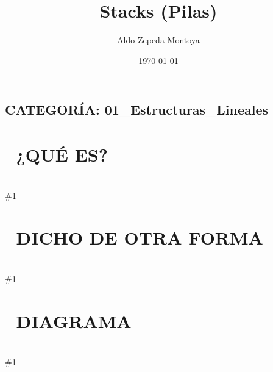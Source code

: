 \documentclass{article}
\newcommand{\quees}[1]{
    \section*{🤔 ¿QUÉ ES?}
    \hrulefill \\
    \#1
}
\newcommand{\dichodeotraforma}[1]{
    \section*{💬 DICHO DE OTRA FORMA}
    \hrulefill \\
    \#1
}
\newcommand{\diagrama}[1]{
    \section*{🎨 DIAGRAMA}
    \hrulefill \\
    \#1
}
\begin{document}
\title{Stacks (Pilas)}
\author{Aldo Zepeda Montoya}
\date{\today}
\maketitle

\subsection*{CATEGORÍA: 01\_Estructuras\_Lineales}

\quees{
Una pila de platos 🍽️ en el fregadero. Solo puedes poner platos
encima (push) y solo puedes agarrar el de hasta arriba (pop). 

Si quieres el plato de abajo, debes quitar todos los de encima primero. 
Es una estructura "LIFO" (Last In, First Out): el último en entrar
es el primero en salir.

Imagina un tubo de papas Pringles 🥔: la última papa que metieron
en la fábrica es la primera que te comes al abrir el tubo.
}

\dichodeotraforma{
Un Stack es una estructura de datos lineal de tipo ADT (Abstract Data
Type) que restringe el acceso a un solo extremo: el "Top". 

Es fundamental para el funcionamiento de las computadoras, ya que
el "Call Stack" de los lenguajes de programación usa esta lógica
para gestionar las llamadas a funciones y la recursión.
}

\diagrama{\begin{verbatim}
push(A) → push(B) → push(C)

     [C]  ← TOP (C es el último en entrar)
     [B]
     [A]  ← BOTTOM

pop() → devuelve C y lo quita, queda:

     [B]  ← TOP (ahora B es el nuevo tope)
     [A]
\end{verbatim}}
\end{document}
